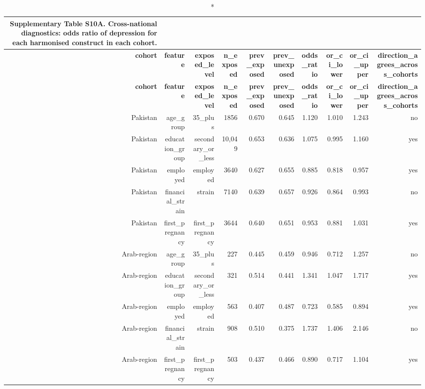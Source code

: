 \documentclass[10pt]{article}
\begin{document}
\tiny
\setlength{\tabcolsep}{2pt}
\begin{longtable}{rrrrrrrrrr}
\caption*{\textbf{Supplementary Table S10A.} Cross-national diagnostics: odds ratio of depression for each harmonised construct in each cohort.}\\
\toprule
\textbf{cohort} & \textbf{feature} & \textbf{exposed\_level} & \textbf{n\_exposed} & \textbf{prev\_exposed} & \textbf{prev\_unexposed} & \textbf{odds\_ratio} & \textbf{or\_ci\_lower} & \textbf{or\_ci\_upper} & \textbf{direction\_agrees\_across\_cohorts} \\
\midrule
\endfirsthead
\toprule
\textbf{cohort} & \textbf{feature} & \textbf{exposed\_level} & \textbf{n\_exposed} & \textbf{prev\_exposed} & \textbf{prev\_unexposed} & \textbf{odds\_ratio} & \textbf{or\_ci\_lower} & \textbf{or\_ci\_upper} & \textbf{direction\_agrees\_across\_cohorts} \\
\midrule
\endhead
\bottomrule
\endfoot
Pakistan & age\_group & 35\_plus & 1856 & 0.670 & 0.645 & 1.120 & 1.010 & 1.243 & no \\
Pakistan & education\_group & secondary\_or\_less & 10{,}049 & 0.653 & 0.636 & 1.075 & 0.995 & 1.160 & yes \\
Pakistan & employed & employed & 3640 & 0.627 & 0.655 & 0.885 & 0.818 & 0.957 & yes \\
Pakistan & financial\_strain & strain & 7140 & 0.639 & 0.657 & 0.926 & 0.864 & 0.993 & no \\
Pakistan & first\_pregnancy & first\_pregnancy & 3644 & 0.640 & 0.651 & 0.953 & 0.881 & 1.031 & yes \\
Arab-region & age\_group & 35\_plus & 227 & 0.445 & 0.459 & 0.946 & 0.712 & 1.257 & no \\
Arab-region & education\_group & secondary\_or\_less & 321 & 0.514 & 0.441 & 1.341 & 1.047 & 1.717 & yes \\
Arab-region & employed & employed & 563 & 0.407 & 0.487 & 0.723 & 0.585 & 0.894 & yes \\
Arab-region & financial\_strain & strain & 908 & 0.510 & 0.375 & 1.737 & 1.406 & 2.146 & no \\
Arab-region & first\_pregnancy & first\_pregnancy & 503 & 0.437 & 0.466 & 0.890 & 0.717 & 1.104 & yes \\
\bottomrule
\end{longtable}
\normalsize
\end{document}
